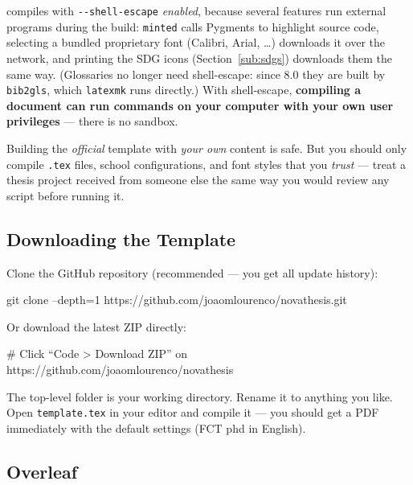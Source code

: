 \begin{warningbox}[title={Security: compiling runs external programs (\texttt{-\/-shell-escape})}]
  \label{box:shell-escape-security}
  \novathesis{} compiles with \texttt{-{}-shell-escape} \emph{enabled},
  because several features run external programs during the build:
  \texttt{minted} calls Pygments to highlight source code, selecting a
  bundled proprietary font (Calibri, Arial, \ldots) downloads it over the
  network, and printing the SDG icons (Section~\ref{sub:sdgs}) downloads them
  the same way.  (Glossaries no longer need shell-escape: since 8.0 they are built
  by \texttt{bib2gls}, which \texttt{latexmk} runs directly.)  With shell-escape, \textbf{compiling a document can run commands
  on your computer with your own user privileges} — there is no sandbox.

  Building the \emph{official} template with \emph{your own} content is safe.
  But you should only compile \texttt{.tex} files, school configurations, and
  font styles that you \emph{trust} — treat a thesis project received from
  someone else the same way you would review any script before running it.
\end{warningbox}


\subsection{Downloading the Template}
\label{sub:download}

Clone the GitHub repository (recommended — you get all update history):
\begin{bashcode}
git clone --depth=1 https://github.com/joaomlourenco/novathesis.git
\end{bashcode}

Or download the latest ZIP directly:
\begin{bashcode}
# Click “Code > Download ZIP” on https://github.com/joaomlourenco/novathesis
\end{bashcode}

The top-level folder is your working directory.  Rename it to anything
you like.  Open \verb!template.tex! in your editor and compile it — you
should get a \gls{PDF} immediately with the default settings (\gls{FCT}
\gls{phd} in English).

\subsection{Overleaf}
\label{sub:overleaf}

